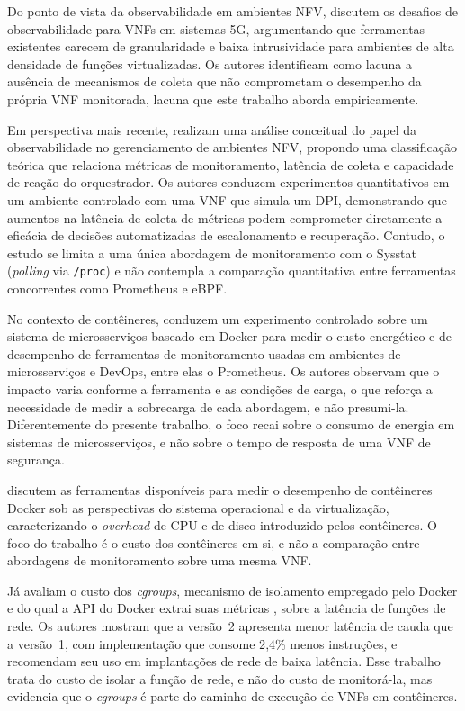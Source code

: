 Do ponto de vista da observabilidade em ambientes NFV,  discutem os desafios de observabilidade para VNFs em sistemas 5G, argumentando que ferramentas existentes carecem de granularidade e baixa intrusividade para ambientes de alta densidade de funções virtualizadas. Os autores identificam como lacuna a ausência de mecanismos de coleta que não comprometam o desempenho da própria VNF monitorada, lacuna que este trabalho aborda empiricamente.

Em perspectiva mais recente,  realizam uma análise conceitual do papel da observabilidade no gerenciamento de ambientes NFV, propondo uma classificação teórica que relaciona métricas de monitoramento, latência de coleta e capacidade de reação do orquestrador. Os autores conduzem experimentos quantitativos em um ambiente controlado com uma VNF que simula um DPI, demonstrando que aumentos na latência de coleta de métricas podem comprometer diretamente a eficácia de decisões automatizadas de escalonamento e recuperação. Contudo, o estudo se limita a uma única abordagem de monitoramento com o Sysstat (\textit{polling} via \texttt{/proc}) e não contempla a comparação quantitativa entre ferramentas concorrentes como Prometheus e eBPF.


No contexto de contêineres,  conduzem um experimento controlado sobre um sistema de microsserviços baseado em Docker para medir o custo energético e de desempenho de ferramentas de monitoramento usadas em ambientes de microsserviços e DevOps, entre elas o Prometheus. Os autores observam que o impacto varia conforme a ferramenta e as condições de carga, o que reforça a necessidade de medir a sobrecarga de cada abordagem, e não presumi-la. Diferentemente do presente trabalho, o foco recai sobre o consumo de energia em sistemas de microsserviços, e não sobre o tempo de resposta de uma VNF de segurança.

 discutem as ferramentas disponíveis para medir o desempenho de contêineres Docker sob as perspectivas do sistema operacional e da virtualização, caracterizando o \textit{overhead} de CPU e de disco introduzido pelos contêineres. O foco do trabalho é o custo dos contêineres em si, e não a comparação entre abordagens de monitoramento sobre uma mesma VNF.

Já  avaliam o custo dos \textit{cgroups}, mecanismo de isolamento empregado pelo Docker e do qual a API do Docker extrai suas métricas \cite{docker_runmetrics}, sobre a latência de funções de rede. Os autores mostram que a versão~2 apresenta menor latência de cauda que a versão~1, com implementação que consome 2{,}4\% menos instruções, e recomendam seu uso em implantações de rede de baixa latência. Esse trabalho trata do custo de isolar a função de rede, e não do custo de monitorá-la, mas evidencia que o \textit{cgroups} é parte do caminho de execução de VNFs em contêineres.

